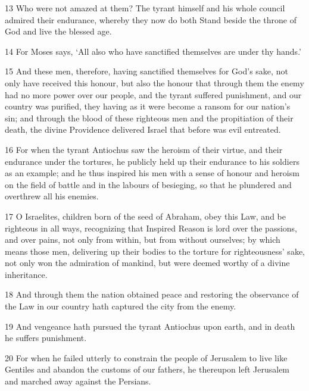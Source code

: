 \par 13 Who were not amazed at them? The tyrant himself and his whole council admired their endurance, whereby they now do both Stand beside the throne of God and live the blessed age.

\par 14 For Moses says, ‘All also who have sanctified themselves are under thy hands.’

\par 15 And these men, therefore, having sanctified themselves for God's sake, not only have received this honour, but also the honour that through them the enemy had no more power over our people, and the tyrant suffered punishment, and our country was purified, they having as it were become a ransom for our nation's sin; and through the blood of these righteous men and the propitiation of their death, the divine Providence delivered Israel that before was evil entreated.

\par 16 For when the tyrant Antiochus saw the heroism of their virtue, and their endurance under the tortures, he publicly held up their endurance to his soldiers as an example; and he thus inspired his men with a sense of honour and heroism on the field of battle and in the labours of besieging, so that he plundered and overthrew all his enemies.

\par 17 O Israelites, children born of the seed of Abraham, obey this Law, and be righteous in all ways, recognizing that Inspired Reason is lord over the passions, and over pains, not only from within, but from without ourselves; by which means those men, delivering up their bodies to the torture for righteousness' sake, not only won the admiration of mankind, but were deemed worthy of a divine inheritance.

\par 18 And through them the nation obtained peace and restoring the observance of the Law in our country hath captured the city from the enemy.

\par 19 And vengeance hath pursued the tyrant Antiochus upon earth, and in death he suffers punishment.

\par 20 For when he failed utterly to constrain the people of Jerusalem to live like Gentiles and abandon the customs of our fathers, he thereupon left Jerusalem and marched away against the Persians.

